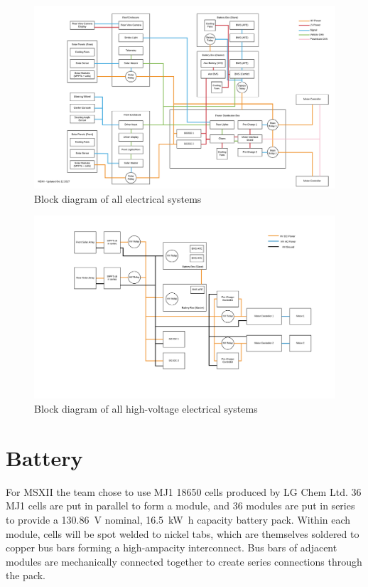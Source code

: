 \documentclass[10pt]{article}
\begin{document}
\begin{figure}
\centering
\includegraphics[width=\textwidth]{figures/msxii-electrical-full-block-diagram}
\caption{Block diagram of all electrical systems}
\label{fig:msxii-electrical-full-block-diagram}
\end{figure}

\begin{figure}
\centering
\includegraphics[width=\textwidth]{figures/msxii-electrical-hv-block-diagram}
\caption{Block diagram of all high-voltage electrical systems}
\label{fig:msxii-electrical-hv-block-diagram}
\end{figure}

\section{Battery}
For MSXII the team chose to use MJ1 18650 cells produced by LG Chem Ltd. 36 MJ1 cells are put in parallel to form a module, and 36 modules are put in series to provide a \SI{130.86}{\volt} nominal, \SI{16.5}{\kilo\watt\hour} capacity battery pack. Within each module, cells will be spot welded to nickel tabs, which are themselves soldered to copper bus bars forming a high-ampacity interconnect. Bus bars of adjacent modules are mechanically connected together to create series connections through the pack.
\end{document}
